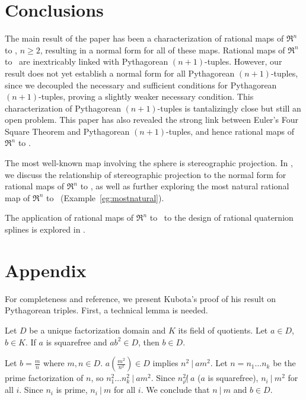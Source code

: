 \section{Conclusions}

The main result of the paper has been a characterization of
rational maps of $\Re^n$ to , $n \geq 2$,
resulting in a normal form for all of these maps.
Rational maps of $\Re^n$ to \ are inextricably linked
with Pythagorean $(n+1)$-tuples.
However, our result does not yet establish a normal form for all
Pythagorean $(n+1)$-tuples,
since we decoupled the necessary and sufficient conditions for
Pythagorean $(n+1)$-tuples,
proving a slightly weaker necessary condition.
This characterization of Pythagorean $(n+1)$-tuples
is tantalizingly close but still an open problem.
This paper has also revealed the strong link between Euler's
Four Square Theorem and Pythagorean $(n+1)$-tuples,
and hence rational maps of $\Re^n$ to .

The most well-known map involving the sphere is stereographic projection.
In \cite{jj98}, we discuss the relationship of stereographic projection
to the normal form for rational maps of $\Re^n$ to ,
as well as further exploring the most natural rational map 
of $\Re^n$ to \ (Example~\ref{eg:mostnatural}).

The application of rational maps of $\Re^n$ to \ to the
design of rational quaternion splines is explored in \cite{jj95,jj+jimbo98}.

\section{Appendix}

For completeness and reference,
we present Kubota's proof of his result on Pythagorean triples.
First, a technical lemma is needed.

\begin{lemma}
\label{lem:applem1}
Let $D$ be a unique factorization domain and $K$ its field of quotients.
Let $a \in D$, $b \in K$.
If $a$ is squarefree and $ab^2 \in D$, then $b \in D$.
\end{lemma}
\prf
Let $b = \frac{m}{n}$ where $m,n \in D$.
$a(\frac{m^2}{n^2}) \in D$ implies $n^2 \ | \ am^2$.
Let $n = n_1 \ldots n_k$ be the prime factorization of $n$,
so $n_1^2 \ldots n_k^2 \ | \ am^2$.
Since $n_i^2 \not | \ a$ ($a$ is squarefree),
$n_i \ | \ m^2$ for all $i$.
Since $n_i$ is prime, $n_i \ | \ m$ for all $i$.
We conclude that $n \ | \ m$ and $b \in D$.
\QED

